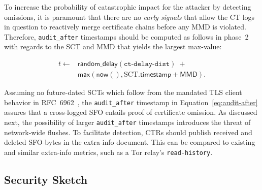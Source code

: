 To increase the probability of catastrophic impact for the attacker by detecting
omissions, it is paramount that there are no \emph{early signals} that
allow the CT logs in question to reactively merge certificate chains before
any MMD is violated.  Therefore, \texttt{audit\_after} timestamps should be
computed as follows in phase~2 with regards to the SCT and MMD that yields the
largest max-value:

\begin{equation} \label{eq:audit-after}
	\begin{aligned}
		t \gets& \mathsf{random\_delay}(\texttt{ct-delay-dist})\;+ \\
		&\mathsf{max}(
			\mathsf{now}(),
			\textrm{SCT}.\mathsf{timestamp}+\mathsf{MMD}
		).
	\end{aligned}
\end{equation}

Assuming no future-dated SCTs which follow from the mandated TLS client behavior
in RFC~6962~\cite{ct}, the \texttt{audit\_after} timestamp in
Equation~\ref{eq:audit-after} assures that a cross-logged SFO entails proof
of certificate omission.  As discussed next, the possibility of larger
\texttt{audit\_after} timestamps introduces the threat of network-wide flushes.
To facilitate detection, CTRs should publish received and deleted SFO-bytes in
the extra-info document.  This can be compared to existing and similar
extra-info metrics, such as a Tor relay's \texttt{read-history}.

%
%

%
%

%
%

%
%

%
%

\subsection{Security Sketch}
%
%
